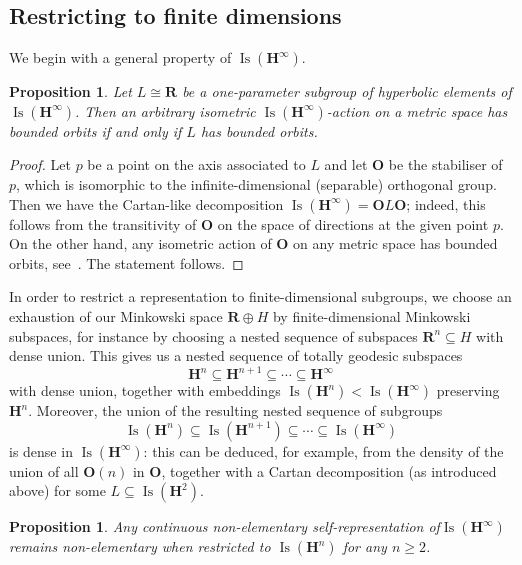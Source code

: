 \documentclass[11pt]{article}
\newtheorem{prop}[theo]{Proposition}
\theoremstyle{definition}
\numberwithin{equation}{section}
\numberwithin{figure}{section}
\numberwithin{table}{section}
\newcommand{\sH}{H}
\newcommand{\RR}{\mathbf{R}}
\newcommand{\HH}{\mathbf{H}}
\newcommand{\HHI}{\mathbf{H}^{\infty}}
\newcommand{\OO}{{\mathbf O}}
\newcommand{\Isomi}{{\Isom}(\HHI)}
\DeclareMathOperator{\Isom}{Is}
\newcommand{\se}{\subseteq}
\begin{document}
\subsection{Restricting to finite dimensions}

We begin with a general property of $\Isomi$.

\begin{prop}\label{prop:BO}
Let $L\cong \RR$ be a one-parameter subgroup of hyperbolic elements of $\Isomi$. Then an arbitrary isometric $\Isomi$-action on a metric space has bounded orbits if and only if $L$ has bounded orbits.
\end{prop}

\begin{proof}
Let $p$ be a point on the axis associated to $L$ and let $\OO$ be the stabiliser of $p$, which is isomorphic to the infinite-dimensional (separable) orthogonal group. Then we have the Cartan-like decomposition $\Isomi= \OO L \OO$; indeed, this follows from the transitivity of $\OO$ on the space of directions at the given point $p$. On the other hand, any isometric action of $\OO$ on any metric space has bounded orbits, see~\cite[p.~190]{Ricard-Rosendal}. The statement follows.
\end{proof}

In order to restrict a representation to finite-dimensional subgroups, we choose an exhaustion of our Minkowski space $\RR\oplus \sH$ by finite-dimensional Minkowski subspaces, for instance by choosing a nested sequence of subspaces $\RR^n\se H$ with dense union. This gives us a nested sequence of totally geodesic subspaces
\[
\HH^n \se \HH^{n+1} \se \cdots \se \HHI
\]
with dense union, together with embeddings $\Isom(\HH^n) < \Isomi$ preserving $\HH^n$. Moreover, the union of the resulting nested sequence of subgroups
\[
\Isom(\HH^n) \se \Isom(\HH^{n+1}) \se \cdots \se \Isomi
\]
is dense in $\Isomi$: this can be deduced, for example, from the density of the union of all $\OO(n)$ in $\OO$, together with a Cartan decomposition (as introduced above) for some $L\se \Isom(\HH^2)$.

\begin{prop}\label{prop:restriction}
Any continuous non-elementary self-representation of\linebreak $\Isomi$ remains non-elementary when restricted to $\Isom(\HH^n)$ for any $n\geq 2$.
\end{prop}
\end{document}
